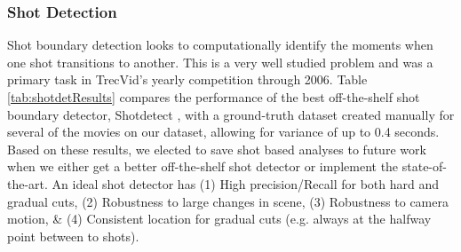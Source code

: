 \subsubsection{Shot Detection}
Shot boundary detection looks to computationally identify the moments when one shot transitions to another. This is a very well studied problem \cite{boreczky1996comparison} \cite{lienhart1998comparison} \cite{lu2013fast} \cite{chavan2014review} and was a primary task in TrecVid's yearly competition \cite{smeaton_video_2010} through 2006. Table \ref{tab:shotdetResults} compares the performance of the best off-the-shelf shot boundary detector, Shotdetect \cite{mathe_shotdetect_2015}, with a ground-truth dataset created manually for several of the movies on our dataset, allowing for variance of up to 0.4 seconds. Based on these results, we elected to save shot based analyses to future work when we either get a better off-the-shelf shot detector or implement the state-of-the-art. An ideal shot detector has (1) High precision/Recall for both hard and gradual cuts, (2) Robustness to large changes in scene, (3) Robustness to camera motion, \& (4) Consistent location for gradual cuts (e.g. always at the halfway point between to shots).
